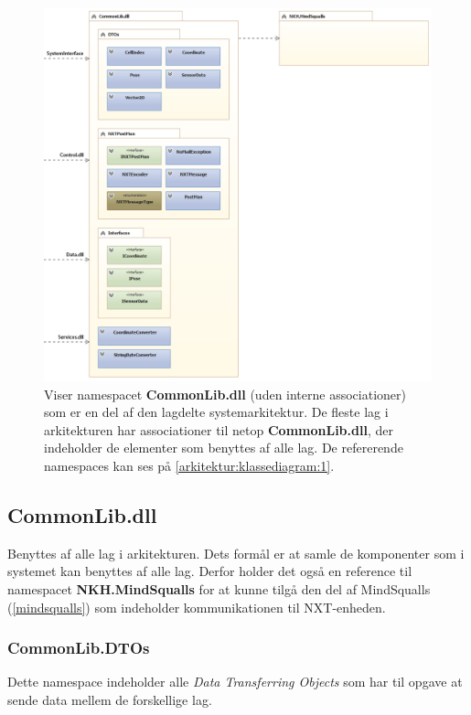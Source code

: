 \begin{figure}
\centering
\includegraphics[width=1\textwidth]{./graphics/systemarkitektur_2}
\caption{Viser namespacet \textbf{CommonLib.dll} (uden interne associationer) som er en del af den lagdelte systemarkitektur. De fleste lag i arkitekturen har associationer til netop \textbf{CommonLib.dll}, der indeholder de elementer som benyttes af alle lag. De refererende namespaces kan ses på \cref{arkitektur:klassediagram:1}.}
\label{arkitektur:klassediagram:2}
\end{figure}
\subsection{CommonLib.dll}\label{arkitektur:commonlib}
Benyttes af alle lag i arkitekturen.
Dets formål er at samle de komponenter som i systemet kan benyttes af alle lag.
Derfor holder det også en reference til namespacet \textbf{NKH.MindSqualls} for at kunne tilgå den del af MindSqualls (\cref{mindsqualls}) som indeholder kommunikationen til NXT-enheden.

\subsubsection{CommonLib.DTOs}
Dette namespace indeholder alle \textit{Data Transferring Objects} som har til opgave at sende data mellem de forskellige lag.

